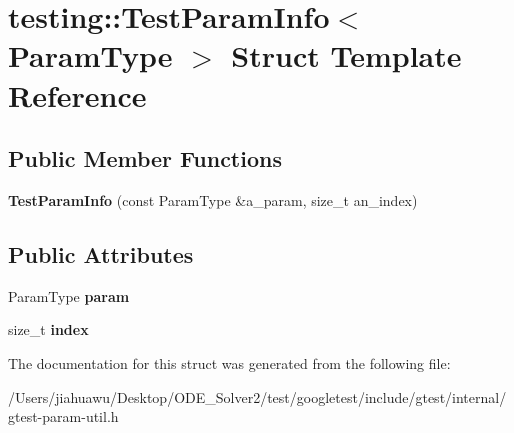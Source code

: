 \hypertarget{structtesting_1_1_test_param_info}{}\section{testing\+:\+:Test\+Param\+Info$<$ Param\+Type $>$ Struct Template Reference}
\label{structtesting_1_1_test_param_info}
\subsection*{Public Member Functions}
\begin{DoxyCompactItemize}
\item 
\mbox{\label{structtesting_1_1_test_param_info_aa54199319bcad5a33c8538ecaecb6de5}} 
{\bfseries Test\+Param\+Info} (const Param\+Type \&a\+\_\+param, size\+\_\+t an\+\_\+index)
\end{DoxyCompactItemize}
\subsection*{Public Attributes}
\begin{DoxyCompactItemize}
\item 
\mbox{\label{structtesting_1_1_test_param_info_a146d921039f9da8b1336f7cc6e8436c2}} 
Param\+Type {\bfseries param}
\item 
\mbox{\label{structtesting_1_1_test_param_info_ad4d7bc02cbcc571eb3c1d2ec3ba5bb53}} 
size\+\_\+t {\bfseries index}
\end{DoxyCompactItemize}


The documentation for this struct was generated from the following file\+:\begin{DoxyCompactItemize}
\item 
/\+Users/jiahuawu/\+Desktop/\+O\+D\+E\+\_\+\+Solver2/test/googletest/include/gtest/internal/gtest-\/param-\/util.\+h\end{DoxyCompactItemize}
